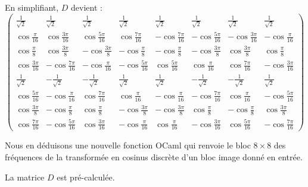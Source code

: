 En simplifiant, $D$ devient :
\[
\begin{pmatrix}
    \frac{1}{\sqrt2} & \frac{1}{\sqrt2} & \frac{1}{\sqrt2} & \frac{1}{\sqrt2} & \frac{1}{\sqrt2} & \frac{1}{\sqrt2} & \frac{1}{\sqrt2} & \frac{1}{\sqrt2} \\[6pt]
    \cos\frac{\pi}{16} & \cos\frac{3\pi}{16} & \cos\frac{5\pi}{16} & \cos\frac{7\pi}{16} & -\cos\frac{7\pi}{16} & -\cos\frac{5\pi}{16} & -\cos\frac{3\pi}{16} & -\cos\frac{\pi}{16} \\[6pt]
    \cos\frac{\pi}{8} & \cos\frac{3\pi}{8} & -\cos\frac{3\pi}{8} & -\cos\frac{\pi}{8} & -\cos\frac{\pi}{8} & -\cos\frac{3\pi}{8} & \cos\frac{3\pi}{8} & \cos\frac{\pi}{8} \\[6pt]
    \cos\frac{3\pi}{16} & -\cos\frac{7\pi}{16} & -\cos\frac{\pi}{16} & -\cos\frac{5\pi}{16} & \cos\frac{5\pi}{16} & \cos\frac{\pi}{16} & \cos\frac{7\pi}{16} & -\cos\frac{3\pi}{16} \\[6pt]
    \frac{1}{\sqrt2} & -\frac{1}{\sqrt2} & -\frac{1}{\sqrt2} & \frac{1}{\sqrt2} & \frac{1}{\sqrt2} & -\frac{1}{\sqrt2} & -\frac{1}{\sqrt2} & \frac{1}{\sqrt2} \\[6pt]
    \cos\frac{5\pi}{16} & -\cos\frac{\pi}{16} & \cos\frac{7\pi}{16} & \cos\frac{\pi}{16} & -\cos\frac{\pi}{16} & -\cos\frac{7\pi}{16} & \cos\frac{\pi}{16} & -\cos\frac{5\pi}{16} \\[6pt]
    \cos\frac{3\pi}{8} & -\cos\frac{\pi}{8} & \cos\frac{\pi}{8} & -\cos\frac{3\pi}{8} & -\cos\frac{3\pi}{8} & \cos\frac{\pi}{8} & -\cos\frac{\pi}{8} & \cos\frac{3\pi}{8} \\[6pt]
    \cos\frac{7\pi}{16} & -\cos\frac{5\pi}{16} & \cos\frac{3\pi}{16} & -\cos\frac{\pi}{16} & \cos\frac{\pi}{16} & -\cos\frac{3\pi}{16} & \cos\frac{5\pi}{16} & -\cos\frac{7\pi}{16}
\end{pmatrix}
\]

Nous en déduisons une nouvelle fonction OCaml qui renvoie le bloc $8 \times 8$ des fréquences de la transformée en cosinus discrète d'un bloc image donné en entrée.
\medskip

La matrice $D$ est pré-calculée.
\newpage


